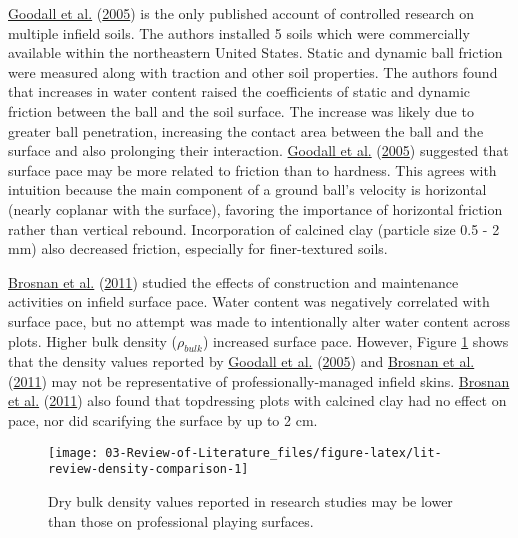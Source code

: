 \documentclass[
  letterpaper,
  openany]{book}
\begin{document}
\protect\hyperlink{ref-Goodall2005}{Goodall et al.} (\protect\hyperlink{ref-Goodall2005}{2005}) is the only published account of controlled research on multiple infield soils.
The authors installed 5 soils which were commercially available within the northeastern United States.
Static and dynamic ball friction were measured along with traction and other soil properties.
The authors found that increases in water content raised the coefficients of static and dynamic friction between the ball and the soil surface.
The increase was likely due to greater ball penetration, increasing the contact area between the ball and the surface and also prolonging their interaction.
\protect\hyperlink{ref-Goodall2005}{Goodall et al.} (\protect\hyperlink{ref-Goodall2005}{2005}) suggested that surface pace may be more related to friction than to hardness.
This agrees with intuition because the main component of a ground ball's velocity is horizontal (nearly coplanar with the surface), favoring the importance of horizontal friction rather than vertical rebound.
Incorporation of calcined clay (particle size 0.5 - 2 mm) also decreased friction, especially for finer-textured soils.

\protect\hyperlink{ref-Brosnan2011}{Brosnan et al.} (\protect\hyperlink{ref-Brosnan2011}{2011}) studied the effects of construction and maintenance activities on infield surface pace.
Water content was negatively correlated with surface pace, but no attempt was made to intentionally alter water content across plots.
Higher bulk density (\(\rho_{bulk}\)) increased surface pace.
However, Figure \ref{fig:lit-review-density-comparison} shows that the density values reported by \protect\hyperlink{ref-Goodall2005}{Goodall et al.} (\protect\hyperlink{ref-Goodall2005}{2005}) and \protect\hyperlink{ref-Brosnan2011}{Brosnan et al.} (\protect\hyperlink{ref-Brosnan2011}{2011}) may not be representative of professionally-managed infield skins.
\protect\hyperlink{ref-Brosnan2011}{Brosnan et al.} (\protect\hyperlink{ref-Brosnan2011}{2011}) also found that topdressing plots with calcined clay had no effect on pace, nor did scarifying the surface by up to 2 cm.

\begin{figure}

{\centering \texttt{[image: 03-Review-of-Literature\_files/figure-latex/lit-review-density-comparison-1]} 

}

\caption[Dry density from published literature compared to an actual MLB infield]{Dry bulk density values reported in research studies may be lower than those on professional playing surfaces.}\label{fig:lit-review-density-comparison}
\end{figure}
\end{document}
